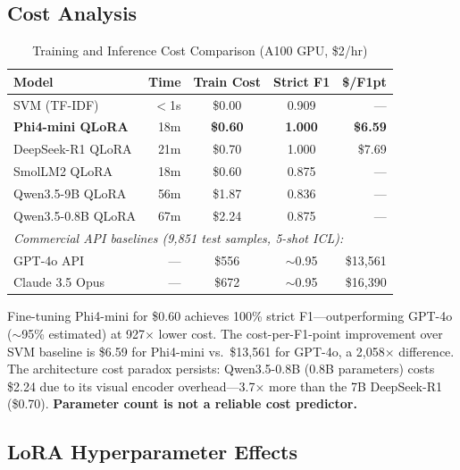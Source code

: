 \documentclass[journal]{IEEEtran}
\begin{document}
\subsection{Cost Analysis}

\begin{table}[!ht]
\centering
\caption{Training and Inference Cost Comparison (A100 GPU, \$2/hr)}
\label{tab:cost}
\begin{tabular}{lrccr}
\toprule
\textbf{Model} & \textbf{Time} & \textbf{Train Cost} & \textbf{Strict F1} & \textbf{\$/F1pt} \\
\midrule
SVM (TF-IDF) & $<$1s & \$0.00 & 0.909 & --- \\
\textbf{Phi4-mini QLoRA} & 18m & \textbf{\$0.60} & \textbf{1.000} & \textbf{\$6.59} \\
DeepSeek-R1 QLoRA & 21m & \$0.70 & 1.000 & \$7.69 \\
SmolLM2 QLoRA & 18m & \$0.60 & 0.875 & --- \\
Qwen3.5-9B QLoRA & 56m & \$1.87 & 0.836 & --- \\
Qwen3.5-0.8B QLoRA & 67m & \$2.24 & 0.875 & --- \\
\midrule
\multicolumn{5}{l}{\emph{Commercial API baselines (9,851 test samples, 5-shot ICL):}} \\
GPT-4o API & --- & \$556 & $\sim$0.95 & \$13,561 \\
Claude 3.5 Opus & --- & \$672 & $\sim$0.95 & \$16,390 \\
\bottomrule
\end{tabular}
\end{table}

Fine-tuning Phi4-mini for \$0.60 achieves 100\% strict F1---outperforming GPT-4o ($\sim$95\% estimated) at 927$\times$ lower cost. The cost-per-F1-point improvement over SVM baseline is \$6.59 for Phi4-mini vs.\ \$13,561 for GPT-4o, a 2,058$\times$ difference. The architecture cost paradox persists: Qwen3.5-0.8B (0.8B parameters) costs \$2.24 due to its visual encoder overhead---3.7$\times$ more than the 7B DeepSeek-R1 (\$0.70). \textbf{Parameter count is not a reliable cost predictor.}

\subsection{LoRA Hyperparameter Effects}
\end{document}
